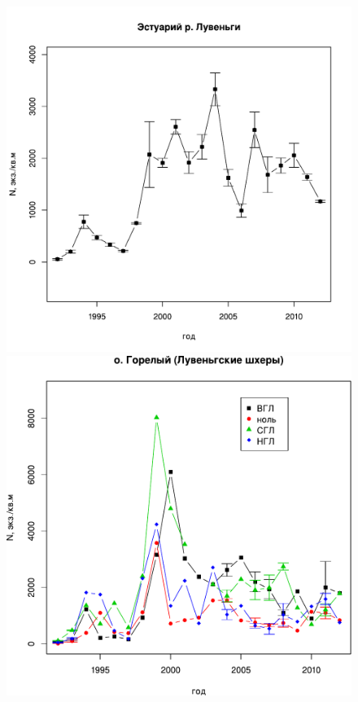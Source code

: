 	\begin{figure}[p]

	\begin{minipage}[b]{.49\linewidth}
	\begin{center}
		\includegraphics[width=\linewidth]{../White_Sea/Estuatiy_Luvenga/N2_dynamic1.pdf}
	\end{center}
	\end{minipage}
%
	\hfil %
%
	\begin{minipage}[b]{.49\linewidth}
	\begin{center}
		\includegraphics[width=\linewidth]{../White_Sea/Luvenga_Goreliy/N2_dynamic1.pdf}

\end{center}
\end{minipage}
\end{figure}
